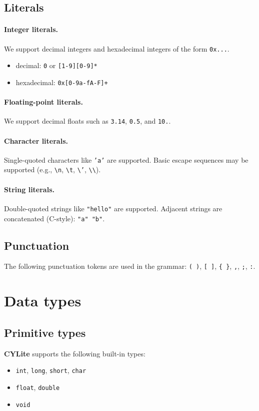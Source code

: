 \documentclass[11pt]{article}
\newcommand{\lang}{\textbf{CYLite}}
\begin{document}
\subsection{Literals}
\paragraph{Integer literals.}
We support decimal integers and hexadecimal integers of the form \texttt{0x...}.
\begin{itemize}
	\item decimal: \texttt{0} or \texttt{[1-9][0-9]*}
	\item hexadecimal: \texttt{0x[0-9a-fA-F]+}
\end{itemize}

\paragraph{Floating-point literals.}
We support decimal floats such as \texttt{3.14}, \texttt{0.5}, and \texttt{10.}.

\paragraph{Character literals.}
Single-quoted characters like \texttt{'a'} are supported.
Basic escape sequences may be supported (e.g., \texttt{\textbackslash n}, \texttt{\textbackslash t}, \texttt{\textbackslash '}, \texttt{\textbackslash \textbackslash}).

\paragraph{String literals.}
Double-quoted strings like \texttt{"hello"} are supported.
Adjacent strings are concatenated (C-style): \texttt{"a" "b"}.

\subsection{Punctuation}
The following punctuation tokens are used in the grammar: \texttt{( )}, \texttt{[ ]}, \texttt{\{ \}}, \texttt{,}, \texttt{;}, \texttt{:}.

\section{Data types}
\subsection{Primitive types}
\lang{} supports the following built-in types:
\begin{itemize}
	\item \texttt{int}, \texttt{long}, \texttt{short}, \texttt{char}
	\item \texttt{float}, \texttt{double}
	\item \texttt{void}
\end{itemize}
\end{document}

